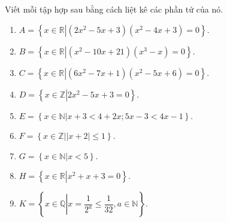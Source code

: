 \begin{bt}%
	Viết mỗi tập hợp sau bằng cách  liệt kê các phần tử của nó.
	\begin{enumerate}
		 \item $A=\left\{x\in \mathbb{R}\left|{\left(2x^2-5x+3\right)\left(x^2-4x+3\right)=0}\right.\right\}$.
		 \item $B=\left\{x\in \mathbb{R}\left|{\left(x^2-10x+21\right)\left(x^3-x\right)=0}\right.\right\}$.
		\item $C=\left\{x\in \mathbb{R}\left|{\left(6x^2-7x+1\right)\left(x^2-5x+6\right)=0}\right.\right\}$. 
		\item  $D=\left\{{x\in \mathbb{Z}\left|{2x^2-5x+3=0}\right.}\right\}$.
		 \item $E=\left\{{x\in \mathbb{N}\left|{x+3<4+2x;5x-3<4x-1}\right.}\right\}$.
		\item  $F=\left\{{x\in \mathbb{Z}\left|{|x+2|\le 1}\right.}\right\}$.
		\item  $G=\left\{{x\in \mathbb{N}\left|{x<5}\right.}\right\}$.
		 \item $H=\left\{{x\in \mathbb{R}\left|{x^2+x+3=0}\right.}\right\}$.
		\item $K=\left\{{x\in \mathbb{Q}\left|{x=\dfrac{1}{2^a}\le  \dfrac{1}{32},a\in \mathbb{N}}\right.}\right\}$.
	\end{enumerate}
\end{bt}
